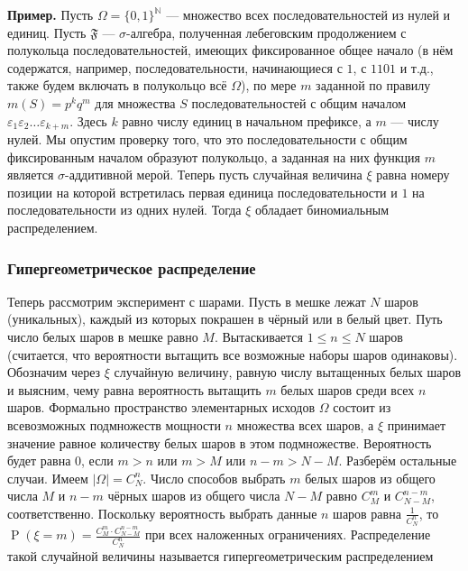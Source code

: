 \documentclass[12pt]{article}
\numberwithin{theorem}{section}
\theoremstyle{definition}
\newenvironment{example}{\indent \textbf{Пример.}}{\indent}
\newcommand{\prob}{\operatorname{P}}
\newcommand{\defin}[2]{\hypertarget{#2}{{\color{red} #1}}}
\newcommand{\events}{\mathfrak{F}}
\begin{document}
	\begin{example}
		Пусть $ \Omega = \{0,1\}^{\mathbb{N}} $ --- множество всех последовательностей из нулей и единиц.
		Пусть $ \events $ --- $ \sigma $-алгебра, полученная лебеговским продолжением с полукольца последовательностей,
		имеющих фиксированное общее начало 
		(в нём содержатся, например, последовательности, начинающиеся с $ 1 $, с $ 1101 $ и т.д., 
		также будем включать в полукольцо всё $ \Omega $), 
		по мере $ m $ заданной по правилу $ m(S) = p^kq^m $ для множества $ S $ последовательностей с общим началом
		$ \varepsilon_1\varepsilon_2\ldots\varepsilon_{k + m} $. Здесь $ k $ равно числу единиц в начальном префиксе, 
		а $ m $ --- числу нулей. 
		Мы опустим проверку того, что это последовательности с общим фиксированным началом образуют полукольцо,
		а заданная на них функция $ m $ является $ \sigma $-аддитивной мерой.
		Теперь пусть случайная величина $ \xi $ равна номеру позиции на которой встретилась первая единица последовательности
		и $ 1 $ на последовательности из одних нулей.
		Тогда $ \xi $ обладает биномиальным распределением.
	\end{example}
	
	\subsubsection{Гипергеометрическое распределение}
	
	Теперь рассмотрим эксперимент с шарами. Пусть в мешке лежат $ N $ шаров (уникальных), 
	каждый из которых покрашен в чёрный или в белый цвет.
	Путь число белых шаров в мешке равно $ M $. Вытаскивается $ 1 \leqslant n \leqslant N $ шаров
	(считается, что вероятности вытащить все возможные наборы шаров одинаковы).
	Обозначим через $ \xi $ случайную величину, равную числу вытащенных белых шаров и выясним, чему равна вероятность
	вытащить $ m $ белых шаров среди всех $ n $ шаров.
	Формально пространство элементарных исходов $ \Omega $ состоит из всевозможных подмножеств мощности $ n $
	множества всех шаров, а $ \xi $ принимает значение равное количеству белых шаров в этом подмножестве.
	Вероятность будет равна $ 0 $, если $ m > n $ или $ m > M $ или $ n - m > N - M $. Разберём остальные случаи.
	Имеем $ |\Omega| = C_N^n $. Число способов выбрать $ m $ белых шаров из общего числа $ M $
	и $ n - m $ чёрных шаров из общего числа $ N - M $ равно $ C_M^m $ и $ C_{N - M}^{n - m} $, соответственно.
	Поскольку вероятность выбрать данные $ n $ шаров равна $ \tfrac{1}{C_N^n} $,
	то $ \prob(\xi = m) = \tfrac{C_M^m \cdot C_{N - M}^{n - m}}{C_N^n} $ при всех наложенных ограничениях.
	Распределение такой случайной величины называется \defin{гипергеометрическим распределением}{hypergeometric-distribution}
	
\end{document}

